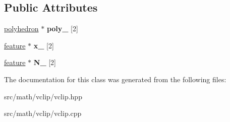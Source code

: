 \subsection*{Public Attributes}
\begin{DoxyCompactItemize}
\item 
\hypertarget{classvclip_a30004834c5276ea16cf7efcc6c9c986b}{
\hyperlink{classpolyhedron}{polyhedron} $\ast$ {\bfseries poly\_\-} \mbox{[}2\mbox{]}}
\label{classvclip_a30004834c5276ea16cf7efcc6c9c986b}

\item 
\hypertarget{classvclip_aebef7285e6233921964723547a7634e8}{
\hyperlink{classfeature}{feature} $\ast$ {\bfseries x\_\-} \mbox{[}2\mbox{]}}
\label{classvclip_aebef7285e6233921964723547a7634e8}

\item 
\hypertarget{classvclip_a79d13fa10a641a59d353b304ed32bd71}{
\hyperlink{classfeature}{feature} $\ast$ {\bfseries N\_\-} \mbox{[}2\mbox{]}}
\label{classvclip_a79d13fa10a641a59d353b304ed32bd71}

\end{DoxyCompactItemize}


The documentation for this class was generated from the following files:\begin{DoxyCompactItemize}
\item 
src/math/vclip/vclip.hpp\item 
src/math/vclip/vclip.cpp\end{DoxyCompactItemize}
